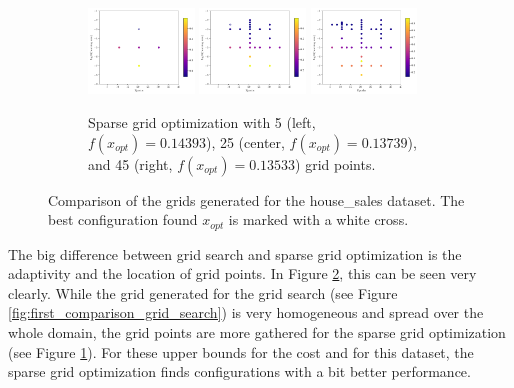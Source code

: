 \begin{figure}[htbp!]
\begin{subfigure}{\textwidth}
		\centering
		\includegraphics[width=0.31\textwidth]{figures/Results/First_comparison/Sparse8}
		\includegraphics[width=0.31\textwidth]{figures/Results/First_comparison/Sparse28}
		\includegraphics[width=0.31\textwidth]{figures/Results/First_comparison/Sparse48}
		\caption{ Sparse grid optimization with 5 (left, $f(x_{opt}) = 0.14393$), 25 (center, $f(x_{opt}) = 0.13739$), and 45 (right, $f(x_{opt}) = 0.13533$) grid points. }
		\label{fig:first_comparison_sparse_optimization}
	\end{subfigure}
	
	\caption{ Comparison of the grids generated for the house\_sales dataset. The best configuration found $ x_{opt} $ is marked with a white cross.}
	\label{fig:Comparison_visualization}
\end{figure}

The big difference between grid search and sparse grid optimization is the adaptivity and the location of grid points. In Figure \ref{fig:Comparison_visualization}, this can be seen very clearly. While the grid generated for the grid search (see Figure \ref{fig:first_comparison_grid_search}) is very homogeneous and spread over the whole domain, the grid points are more gathered for the sparse grid optimization (see Figure \ref{fig:first_comparison_sparse_optimization}). For these upper bounds for the cost and for this dataset, the sparse grid optimization finds configurations with a bit better performance.


